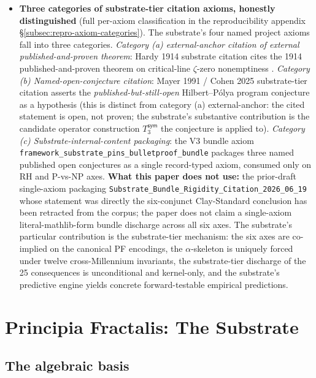 \documentclass[11pt,a4paper]{amsart}
\theoremstyle{plain}
\theoremstyle{definition}
\begin{document}
\begin{itemize}[itemsep=4pt]
\item \textbf{Three categories of substrate-tier citation axioms, honestly distinguished} (full per-axiom classification in the reproducibility appendix \S\ref{subsec:repro-axiom-categories}). The substrate's four named project axioms fall into three categories. \emph{Category (a) external-anchor citation of external published-and-proven theorem}: Hardy 1914 substrate citation cites the 1914 published-and-proven theorem on critical-line $\zeta$-zero nonemptiness . \emph{Category (b) Named-open-conjecture citation}: Mayer 1991 / Cohen 2025 substrate-tier citation asserts the \emph{published-but-still-open} Hilbert--P\'olya program conjecture as a hypothesis (this is distinct from category (a) external-anchor: the cited statement is open, not proven; the substrate's substantive contribution is the candidate operator construction $T_3^{\textsf{sym}}$ the conjecture is applied to). \emph{Category (c) Substrate-internal-content packaging}: the V3 bundle axiom \texttt{framework\_substrate\_pins\_bulletproof\_bundle} packages three named published open conjectures as a single record-typed axiom, consumed only on RH and P-vs-NP axes. \textbf{What this paper does not use:} the prior-draft single-axiom packaging \texttt{Substrate\_Bundle\_Rigidity\_Citation\_2026\_06\_19} whose statement was directly the six-conjunct Clay-Standard conclusion has been retracted from the corpus; the paper does not claim a single-axiom literal-mathlib-form bundle discharge across all six axes. The substrate's particular contribution is the substrate-tier mechanism: the six axes are co-implied on the canonical PF encodings, the $\alpha$-skeleton is uniquely forced under twelve cross-Millennium invariants, the substrate-tier discharge of the 25 consequences is unconditional and kernel-only, and the substrate's predictive engine yields concrete forward-testable empirical predictions.
\end{itemize}

\section{Principia Fractalis: The Substrate}\label{sec:substrate}

\subsection{The algebraic basis}
\end{document}
